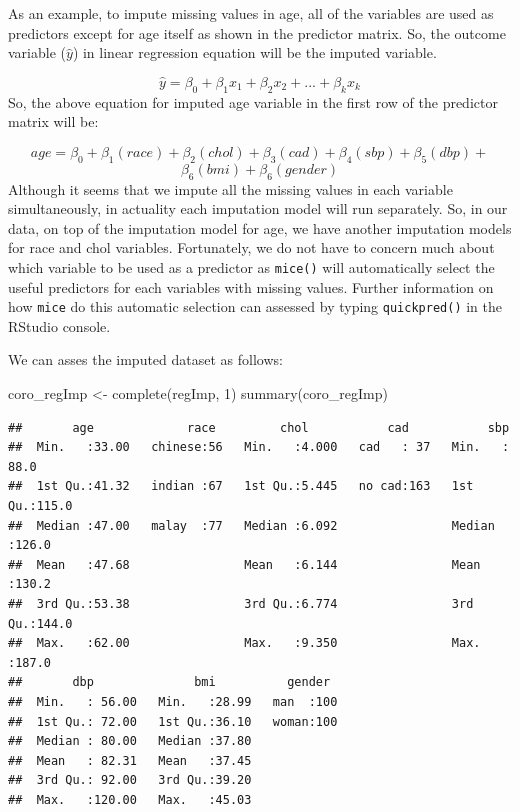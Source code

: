 \documentclass[
  10pt,
]{krantz}
\newenvironment{Shaded}{\begin{snugshade}}{\end{snugshade}}
\newcommand{\DecValTok}[1]{\textcolor[rgb]{0.00,0.00,0.81}{#1}}
\newcommand{\FunctionTok}[1]{\textcolor[rgb]{0.00,0.00,0.00}{#1}}
\newcommand{\NormalTok}[1]{#1}
\newcommand{\OtherTok}[1]{\textcolor[rgb]{0.56,0.35,0.01}{#1}}
\begin{document}
As an example, to impute missing values in age, all of the variables are used as predictors except for age itself as shown in the predictor matrix. So, the outcome variable (\(\hat{y}\)) in linear regression equation will be the imputed variable.

\[
\hat{y} = \beta_0 + \beta_1x_1 + \beta_2x_2 + ... + \beta_kx_k
\]
So, the above equation for imputed age variable in the first row of the predictor matrix will be:

\[
age = \beta_0 + \beta_1(race) + \beta_2(chol) + \beta_3(cad) + \beta_4(sbp) + \beta_5(dbp) + 
\]
\[
\beta_6(bmi) + \beta_6(gender)
\]
Although it seems that we impute all the missing values in each variable simultaneously, in actuality each imputation model will run separately. So, in our data, on top of the imputation model for age, we have another imputation models for race and chol variables. Fortunately, we do not have to concern much about which variable to be used as a predictor as \texttt{mice()} will automatically select the useful predictors for each variables with missing values. Further information on how \texttt{mice} do this automatic selection can assessed by typing \texttt{quickpred()} in the RStudio console.

We can asses the imputed dataset as follows:

\begin{Shaded}
\begin{Highlighting}[]
\NormalTok{coro\_regImp }\OtherTok{\textless{}{-}} \FunctionTok{complete}\NormalTok{(regImp, }\DecValTok{1}\NormalTok{)}
\FunctionTok{summary}\NormalTok{(coro\_regImp)}
\end{Highlighting}
\end{Shaded}

\begin{verbatim}
##       age             race         chol           cad           sbp       
##  Min.   :33.00   chinese:56   Min.   :4.000   cad   : 37   Min.   : 88.0  
##  1st Qu.:41.32   indian :67   1st Qu.:5.445   no cad:163   1st Qu.:115.0  
##  Median :47.00   malay  :77   Median :6.092                Median :126.0  
##  Mean   :47.68                Mean   :6.144                Mean   :130.2  
##  3rd Qu.:53.38                3rd Qu.:6.774                3rd Qu.:144.0  
##  Max.   :62.00                Max.   :9.350                Max.   :187.0  
##       dbp              bmi          gender   
##  Min.   : 56.00   Min.   :28.99   man  :100  
##  1st Qu.: 72.00   1st Qu.:36.10   woman:100  
##  Median : 80.00   Median :37.80              
##  Mean   : 82.31   Mean   :37.45              
##  3rd Qu.: 92.00   3rd Qu.:39.20              
##  Max.   :120.00   Max.   :45.03
\end{verbatim}
\end{document}
